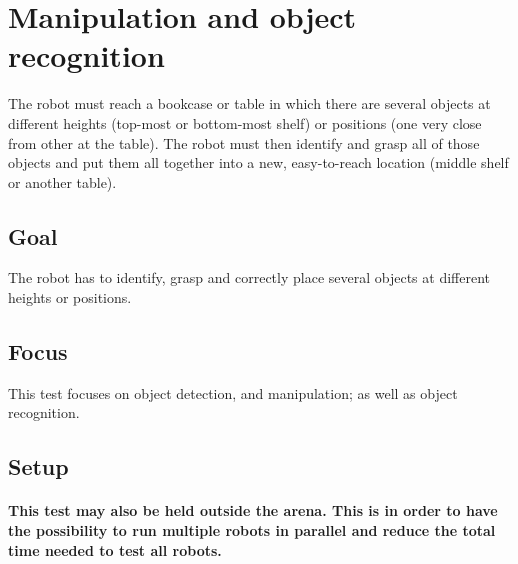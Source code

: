\section{Manipulation and object recognition}

The robot must reach a bookcase or table in which there are several objects at different heights (top-most or bottom-most shelf) or positions (one very close from other at the table). The robot must then identify and grasp all of those objects and put them all together into a new, easy-to-reach location (middle shelf or another table).

\subsection{Goal}
The robot has to identify, grasp and correctly place several objects at different heights or positions.


\subsection{Focus}

This test focuses on object detection, and manipulation; as well as object recognition.

\subsection{Setup}
\paragraph{This test may also be held outside the arena.
  This is in order to have the possibility to run multiple robots in parallel and reduce the total time needed to test all robots.}

